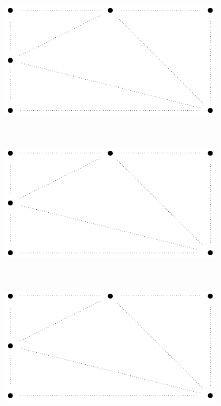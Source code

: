 \documentclass[a4paper]{article}
\begin{document}
\begin{figure}
    \centering
    \begin{subfigure}[b]{0.3\textwidth}
        \includegraphics[width=\textwidth]{HalfRinzma}
    \end{subfigure}
    ~ %
    \begin{subfigure}[b]{0.3\textwidth}
        \includegraphics[width=\textwidth]{HalfRinzma}
    \end{subfigure}
    ~ %
    \begin{subfigure}[b]{0.3\textwidth}
        \includegraphics[width=\textwidth]{HalfRinzma}
    \end{subfigure}
    \label{fig:animals}
\end{figure}
\end{document}
